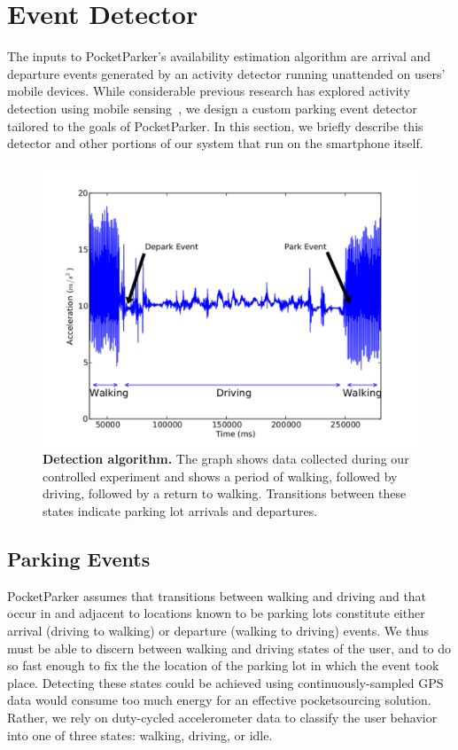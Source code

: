 \section{Event Detector}
\label{sec-detector}
The inputs to PocketParker's availability estimation algorithm are arrival and
departure events generated by an activity detector running unattended on users'
mobile devices.  While considerable previous research has explored activity
detection using mobile sensing~\cite{Constandache:2010:DYS, Keally:2011:PTP,
Reddy:2010:UMP, Yang:2011:DDP, Wang:2009:FEE}, we design a custom parking event
detector tailored to the goals of PocketParker.  In this section, we briefly
describe this detector and other portions of our system that run on the
smartphone itself.  

\begin{figure}[t]
  \centering
  \includegraphics[width=0.8\columnwidth]{./figures/detection-cropped.pdf}

  \caption{\textbf{Detection algorithm.} The graph shows data collected
    during our controlled experiment and shows a period of walking, followed by
    driving, followed by a return to walking. Transitions between these states
  indicate parking lot arrivals and departures.}

  \label{fig-detection}
\end{figure}

\subsection{Parking Events}
\label{subsec-goals}
PocketParker assumes that transitions between walking and driving and that occur
in and adjacent to locations known to be parking lots constitute either
arrival (driving to walking) or departure (walking to driving) events.  We thus
must be able to discern between walking and driving states of the user, and to 
do so fast enough to fix the the location of the parking lot in which the
event took place.  Detecting these states could be achieved using
continuously-sampled GPS data would consume too much energy for an effective
pocketsourcing solution.  Rather, we rely on duty-cycled accelerometer data to
classify the user behavior into one of three states: walking, driving, or idle.

